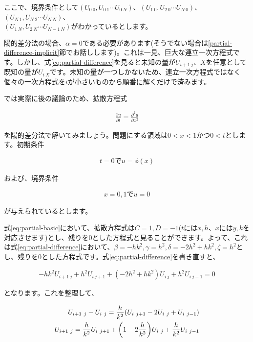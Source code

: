 ここで、境界条件として$(U_{0\ 0},U_{0\ 1}\cdots U_{0\ N})$、$(U_{1\ 0},U_{2\ 0}\cdots U_{N\ 0})$、$(U_{N\ 1},U_{N\ 2}\cdots U_{N\ N})$、\\\noindent$(U_{1\ N},U_{2\ N}\cdots U_{N-1\ N})$がわかっているとします。

陽的差分法の場合、$\alpha=0$である必要があります(そうでない場合は\ref{partial-difference-implicit}節でお話しします)。これは一見、巨大な連立一次方程式です。しかし、式\ref{eq:partial-difference}を見ると未知の量が$U_{i+1\ j}$、$X$を任意として既知の量が$U_{i\ X}$です。未知の量が一つしかないため、連立一次方程式ではなく個々の一次方程式を$i$が小さいものから順番に解くだけで済みます。

では実際に後の議論のため、拡散方程式

\begin{eqnarray}
    \frac{\partial u}{\partial t}=\frac{\partial^2u}{\partial x^2}
\end{eqnarray}

\noindent
を陽的差分法で解いてみましょう。問題にする領域は$0<x<1$かつ$0<t$とします。初期条件

\begin{eqnarray}
    t=0\mbox{で}u=\phi(x)
\end{eqnarray}

\noindent
および、境界条件

\begin{eqnarray}
    x=0,1\mbox{で}u=0
\end{eqnarray}

\noindent
が与えられているとします。

式\ref{eq:partial-basic}において、拡散方程式は$C=1, D=-1$($t$には$x,h$、$x$には$y,k$を対応させます)とし、残りを0とした方程式と見ることができます。よって、これは式\ref{eq:partial-difference}において、$\beta=-hk^2,\gamma=h^2,\delta=-2h^2+hk^2,\zeta=h^2$とし、残りを0とした方程式です。式\ref{eq:partial-difference}を書き直すと、

\begin{eqnarray}
    -hk^2U_{i+1\ j}+h^2U_{i\ j+1}+(-2h^2+hk^2)U_{i\ j}+h^2U_{i\ j-1}=0
\end{eqnarray}

\noindent
となります。これを整理して、

\begin{eqnarray}
    U_{i+1\ j}-U_{i\ j}=\frac{h}{k^2}(U_{i\ j+1}-2U_{i\ j}+U_{i\ j-1}) \\
    U_{i+1\ j}=\frac{h}{k^2}U_{i\ j+1}+\pqty{1-2\frac{h}{k^2}}U_{i\ j}+\frac{h}{k^2}U_{i\ j-1}
    \label{eq:diffusion}
\end{eqnarray}

